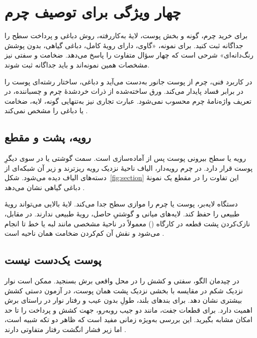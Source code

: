 \section{چهار ویژگی برای توصیف چرم}

برای خرید چرم، گونه و بخش پوست، لایۀ به‌کاررفته، روش دباغی و پرداخت سطح را جداگانه ثبت کنید. برای نمونه، «گاوی، دارای رویۀ کامل، دباغی گیاهی، بدون پوشش رنگ‌دانه‌ای» شرحی است که چهار سؤال متفاوت را پاسخ می‌دهد. ضخامت و سفتی نیز مشخصات همین نمونه‌اند و باید جداگانه ثبت شوند.

در کاربرد فنی، چرم از پوست جانور به‌دست می‌آید و دباغی، ساختار رشته‌ای پوست را در برابر فساد پایدار می‌کند. ورق ساخته‌شده از ذرات خردشدۀ چرم و چسباننده، در تعریف واژه‌نامۀ  چرم محسوب نمی‌شود. عبارت تجاری  نیز به‌تنهایی گونه، لایه، ضخامت یا دباغی را مشخص نمی‌کند \cite{lwg}.

\subsection{رویه، پشت و مقطع}

رویه یا  سطح بیرونی پوست پس از آماده‌سازی است. سمت گوشتی یا  در سوی دیگرِ پوست قرار دارد. در چرم رویه‌دار، الیاف ناحیۀ نزدیک رویه ریزترند و زیر آن شبکه‌ای از دسته‌های الیاف دیده می‌شود. شکل~\ref{fig:section} این تفاوت را در مقطع یک نمونۀ دباغی گیاهی نشان می‌دهد \cite{lwg}.


دستگاه لایه‌بر، پوست یا چرم را موازی سطح جدا می‌کند. لایۀ بالایی می‌تواند رویۀ طبیعی را حفظ کند. لایه‌های میانی و گوشتیِ حاصل، رویۀ طبیعی ندارند. در مقابل، نازک‌کردن پشت قطعه در کارگاه () معمولاً در ناحیۀ مشخصی مانند لبه یا خط تا انجام می‌شود و نقش آن کم‌کردن ضخامت همان ناحیه است \cite{lwg,jrc}.

\subsection{پوست یک‌دست نیست}

در چیدمان الگو، سفتی و کشش را در محل واقعی برش بسنجید. ممکن است نوار نزدیک شکم در مقایسه با بخشی نزدیک پشت همان پوست، در آزمون دستی کشش بیشتری نشان دهد. برای بندهای بلند، طولِ بدون عیب و رفتار نوار در راستای برش اهمیت دارد. برای قطعات جفت، مانند دو جیب روبه‌رو، جهت کشش و پرداخت را تا حد امکان مشابه بگیرید. این بررسی به‌ویژه زمانی مفید است که ظاهر دو تکه شبیه است، اما زیر فشار انگشت رفتار متفاوتی دارند \cite{jrc}.

